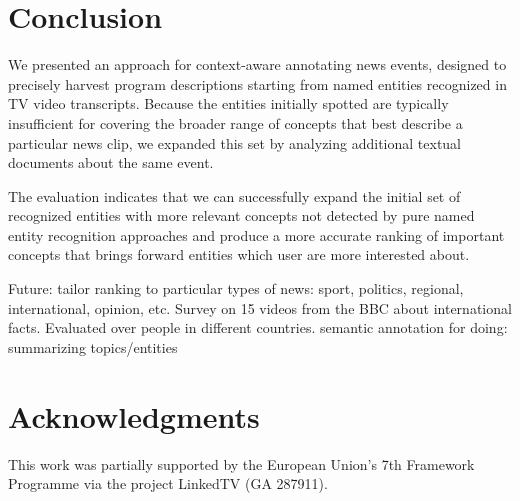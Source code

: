 \documentclass{llncs}
\begin{document}

\section{Conclusion}
\label{sec:Conclusion}
We presented an approach for context-aware annotating news events, designed to precisely harvest program descriptions starting from named entities recognized in TV video transcripts. Because the entities initially spotted are typically insufficient for covering the broader range of concepts that best describe a particular news clip, we expanded this set by analyzing additional textual documents about the same event.

The evaluation indicates that we can successfully expand the initial set of recognized entities with more relevant concepts not detected by pure named entity recognition approaches and produce a more accurate ranking of important concepts that brings forward entities which user are more interested about.

Future: tailor ranking to particular types of news: sport, politics, regional, international, opinion, etc. Survey on 15 videos from the BBC about international facts. Evaluated over people in different countries.
semantic annotation for doing: summarizing topics/entities



\section*{Acknowledgments}
This work was partially supported by the European Union's 7th Framework Programme via the project LinkedTV (GA 287911).



\end{document}
